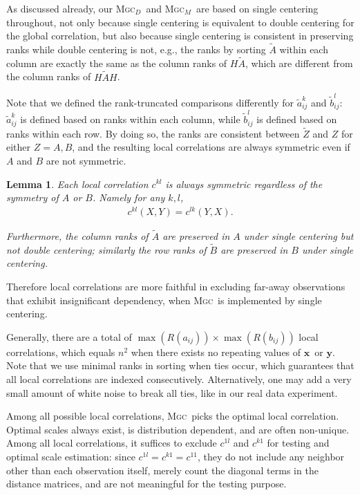 \documentclass[11pt]{article}
\providecommand{\sct}[1]{{\normalfont\textsc{#1}}}
\providecommand{\mt}[1]{\widetilde{#1}}
\providecommand{\mb}[1]{\boldsymbol{#1}}
\newcommand{\G}{c}
\newcommand{\Mgc}{\sct{Mgc}}
\newcommand{\Mgcd}{\sct{Mgc$_D$}}
\newcommand{\Mgcm}{\sct{Mgc$_M$}}
\newcommand{\mbx}{\ensuremath{\mb{x}}}
\newcommand{\mby}{\ensuremath{\mb{y}}}
\newtheorem{lem}{Lemma}
\begin{document}
As discussed already, our \Mgcd~and \Mgcm~are based on single centering throughout, not only because single centering is equivalent to double centering for the global correlation, but also because single centering is consistent in preserving ranks while double centering is not, e.g., the ranks by sorting $\tilde{A}$ within each column are exactly the same as the column ranks of $H\tilde{A}$, which are different from the column ranks of $H\tilde{A}H$. 

Note that we defined the rank-truncated comparisons differently for $\mt{a}_{ij}^k$ and $\mt{b}_{ij}^l$: $\mt{a}_{ij}^k$ is defined based on ranks within each column, while $\mt{b}_{ij}^l$ is defined based on ranks within each row. By doing so, the ranks are consistent between $\tilde{Z}$ and $Z$ for either $Z=A,B$, and the resulting local correlations are always symmetric even if $A$ and $B$ are not symmetric.

\begin{lem}
Each local correlation $\G^{kl}$ is always symmetric regardless of the symmetry of $A$ or $B$. Namely for any $k,l$, 
\begin{align*}
\G^{kl}(X,Y)=\G^{lk}(Y,X).
\end{align*}

Furthermore, the column ranks of $\tilde{A}$ are preserved in $A$ under single centering but not double centering; similarly the row ranks of $\tilde{B}$ are preserved in $B$ under single centering.
\end{lem}
Therefore local correlations are more faithful in excluding far-away observations that exhibit insignificant dependency, when \Mgc~is implemented by single centering.

Generally, there are a total of $\max(R(a_{ij})) \times \max(R(b_{ij}))$ local correlations, which equals $n^2$ when there exists no repeating values of \mbx~or \mby. Note that we use minimal ranks in sorting when ties occur, which guarantees that all local correlations are indexed consecutively. Alternatively, one may add a very small amount of white noise to break all ties, like in our real data experiment.

Among all possible local correlations, \Mgc~picks the optimal local correlation. Optimal scales always exist,  is distribution dependent, and are often non-unique. Among all local correlations, it suffices to exclude $\G^{1l}$ and $\G^{k1}$ for testing and optimal scale estimation: since $\G^{1l}=\G^{k1}=\G^{11}$, they do not include any neighbor other than each observation itself, merely count the diagonal terms in the distance matrices, and are not meaningful for the testing purpose.
\end{document}
